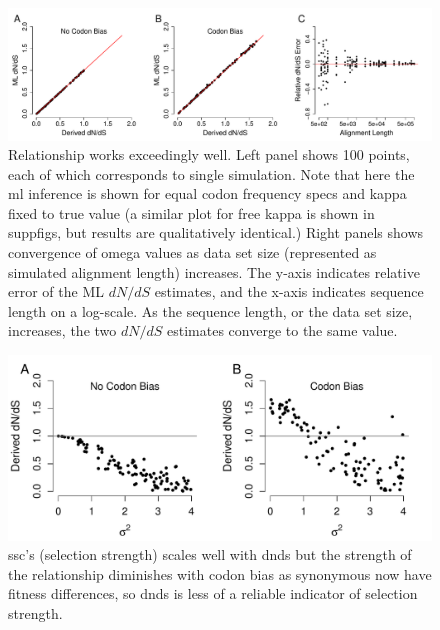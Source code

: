 \documentclass[11pt]{article}
\begin{document}
\begin{figure}[H]
\centerline{\includegraphics[width=8in]{figures/MainText/regression_convergence.pdf}}
\caption{\label{reg_conv} Relationship works exceedingly well. Left panel shows 100 points, each of which corresponds to single simulation. Note that here the ml inference is shown for equal codon frequency specs and kappa fixed to true value (a similar plot for free kappa is shown in suppfigs, but results are qualitatively identical.) Right panels shows convergence of omega values as data set size (represented as simulated alignment length) increases. The y-axis indicates relative error of the ML $dN/dS$ estimates, and the x-axis indicates sequence length on a log-scale. As the sequence length, or the data set size, increases, the two $dN/dS$ estimates converge to the same value. }
\end{figure}


\bigskip
\begin{figure}[H]
\centerline{\includegraphics[width=5in]{figures/MainText/stddev_vs_dnds.pdf}}
\caption{\label{stddev_dnds} ssc's (selection strength) scales well with dnds but the strength of the relationship diminishes with codon bias as synonymous now have fitness differences, so dnds is less of a reliable indicator of selection strength.}
\end{figure}
\end{document}
